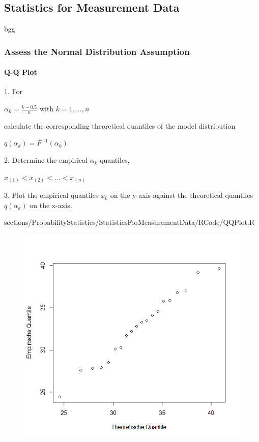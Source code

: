 \subsection{Statistics for Measurement Data}
 bgg\subsubsection{Assess the Normal Distribution Assumption}
{
		\paragraph{Q-Q Plot}
				\RTheory%
				{%
				1. For
				 \begin{center}
				 $\alpha_k=\frac{k-0.5}{n}$ with $k=1,...,n$\\
				 \end{center}
				 calculate the corresponding theoretical quantiles of the model distribution
				 \begin{center}
				  $q(\alpha_k)=F^{-1}(\alpha_k)$\\
				 \end{center}				 
				 2. Determine the empirical $\alpha_k$-quantiles,
				 \begin{center}
				  $x_{(1)}<x_{(2)}<...<x_{(n)}$\\
				 \end{center}				 
				3. Plot the empirical quantiles $x_k$ on the y-axis against the theoretical quantiles 					$q(\alpha_k)$ on the x-axis.		 
				}
				{
				sections/ProbabilityStatistics/StatisticsForMeasurementData/RCode/QQPlot.R
				}
\begin{figure}[H]
\begin{minipage}[c]{0.5\textwidth}
    \includegraphics[width=1\linewidth]{images/qqPlot.png}

\end{minipage}
\end{figure}}
